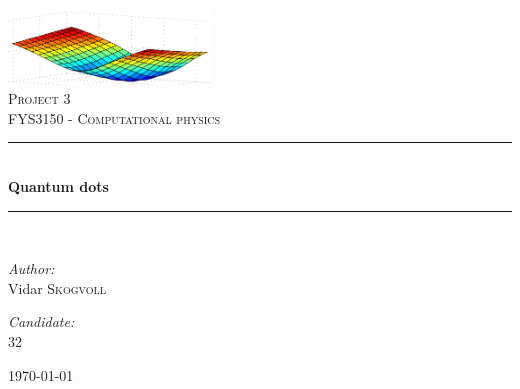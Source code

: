 \documentclass[a4paper,10pt,english]{article}
\numberwithin{figure}{subsection}
\numberwithin{table}{subsection}
\numberwithin{equation}{subsection}
\newcommand{\HRule}{\rule{\linewidth}{0.5mm}}
\begin{document}
\pagestyle{fancy}
\renewcommand{\sectionmark}[1]{\markright{#1}{}}

\pagestyle{fancy}
\renewcommand{\sectionmark}[1]{\markright{\thesection\ #1}}

\fancyhf{}
\lhead{\fancyplain{}{\rightmark }} %
\cfoot{\fancyplain{}{\thepage}}


\begin{titlepage}
\begin{center}

\includegraphics[width=0.4\textwidth]{forside.jpg}~\\[1cm]

\textsc{\LARGE Project 3}\\[1.5cm]

\textsc{\Large FYS3150 - Computational physics}\\[0.5cm]

\HRule \\[0.4cm]
{ \huge \bfseries Quantum dots \\[0.4cm] }

\HRule \\[1.5cm]

\begin{minipage}{0.4\textwidth}
\begin{flushleft} \large
\emph{Author:}\\
Vidar \textsc{Skogvoll}
\end{flushleft}
\end{minipage}
\begin{minipage}{0.4\textwidth}
\begin{flushright} \large
\emph{ Candidate: } \\
 \textsc{ 32}
\end{flushright}
\end{minipage}

\vfill

{\large \today}

\end{center}
\end{titlepage}
\setcounter{page}{2}
\end{document}
